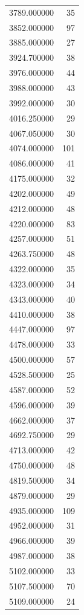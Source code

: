 \begin{tabular}{lr}
3789.000000   &    35 \\
3852.000000   &    97 \\
3885.000000   &    27 \\
3924.700000   &    38 \\
3976.000000   &    44 \\
3988.000000   &    43 \\
3992.000000   &    30 \\
4016.250000   &    29 \\
4067.050000   &    30 \\
4074.000000   &   101 \\
4086.000000   &    41 \\
4175.000000   &    32 \\
4202.000000   &    49 \\
4212.000000   &    48 \\
4220.000000   &    83 \\
4257.000000   &    51 \\
4263.750000   &    48 \\
4322.000000   &    35 \\
4323.000000   &    34 \\
4343.000000   &    40 \\
4410.000000   &    38 \\
4447.000000   &    97 \\
4478.000000   &    33 \\
4500.000000   &    57 \\
4528.500000   &    25 \\
4587.000000   &    52 \\
4596.000000   &    39 \\
4662.000000   &    37 \\
4692.750000   &    29 \\
4713.000000   &    42 \\
4750.000000   &    48 \\
4819.500000   &    34 \\
4879.000000   &    29 \\
4935.000000   &   109 \\
4952.000000   &    31 \\
4966.000000   &    39 \\
4987.000000   &    38 \\
5102.000000   &    33 \\
5107.500000   &    70 \\
5109.000000   &    24 \\

\end{tabular}
